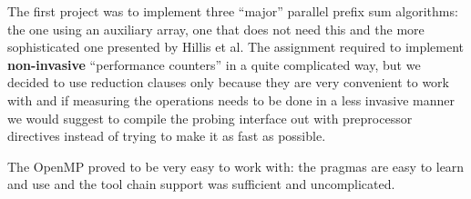 The first project was to implement three ``major'' parallel prefix sum algorithms: the one using an auxiliary array, one that does not need this and the more sophisticated one presented by Hillis et al.
The assignment required to implement \textbf{non-invasive} ``performance counters'' in a quite complicated way, but we decided to use reduction clauses only because they are very convenient to work with and if measuring the operations needs to be done in a less invasive manner we would suggest to compile the probing interface out with preprocessor directives instead of trying to make it as fast as possible.

The OpenMP proved to be very easy to work with: the pragmas are easy to learn and use and the tool chain support was sufficient and uncomplicated.


\openmpprefixseqn
{}\openmpprefixauxarrn
{}\openmpprefixinplacen
{}\openmpprefixhillisn


